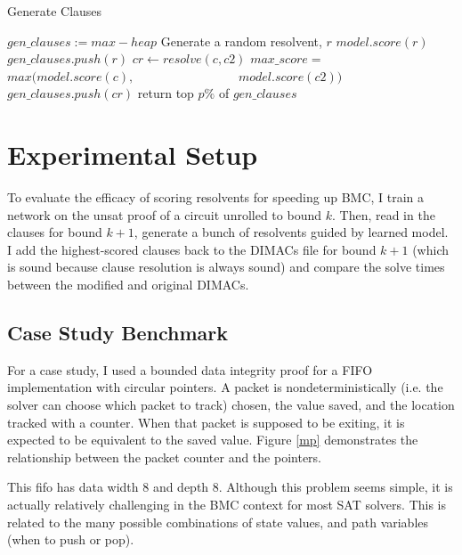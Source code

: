\documentclass[letterpaper]{article} %
\begin{document}
\begin{algorithm}
\caption{Generate Clauses}\label{genclauses}
\begin{algorithmic}[1]
\State $gen\_clauses := max-heap$
\State Generate a random resolvent, $r$
\State $model.score(r)$
\State $gen\_clauses.push(r)$
\EndFor
{}
\State $cr \gets resolve(c, c2)$
\State $max\_score =$
\State \ \ \ \ \ \ \ $max(model.score(c),$ \State \ \ \ \ \ \ \ \ \ \ \ \ \ \ \ \ $model.score(c2))$
\State $gen\_clauses.push(cr)$
\EndIf
\EndFor
\EndFor
\EndWhile
\State return top $p\%$ of $gen\_clauses$
\EndProcedure
\end{algorithmic}
\end{algorithm} 

\section{Experimental Setup}

To evaluate the efficacy of scoring resolvents for speeding up BMC, I train a network on the unsat proof of a circuit unrolled to bound $k$. Then, read in the clauses for bound $k+1$, generate a bunch of resolvents guided by learned model. I add the highest-scored clauses back to the DIMACs file for bound $k+1$ (which is sound because clause resolution is always sound) and compare the solve times between the modified and original DIMACs.

\subsection{Case Study Benchmark}

For a case study, I used a bounded data integrity proof for a FIFO implementation with circular pointers. A packet is nondeterministically (i.e. the solver can choose which packet to track) chosen, the value saved, and the location tracked with a counter. When that packet is supposed to be exiting, it is expected to be equivalent to the saved value. Figure \ref{mp} demonstrates the relationship between the packet counter and the pointers.

This fifo has data width 8 and depth 8. Although this problem seems simple, it is actually relatively challenging in the BMC context for most SAT solvers. This is related to the many possible combinations of state values, and path variables (when to push or pop).
\end{document}
